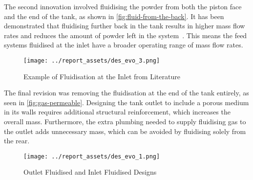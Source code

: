 The second innovation involved fluidising the powder from both the piston face and the end of the tank, as shown in \autoref{fig:fluid-from-the-back}. It has been demonstrated that fluidising further back in the tank results in higher mass flow rates and reduces the amount of powder left in the system~\cite{Tang22}. This means the feed systems fluidised at the inlet have a broader operating range of mass flow rates.
\begin{figure}[htbp]
    \centering
    
    \begin{minipage}{0.7\textwidth}
        \centering
        \texttt{[image: ../report\_assets/des\_evo\_3.png]}
        \caption{Example of Fluidisation at the Inlet from Literature~\cite{NASA2008_20080002287}}\label{fig:fluid-from-the-back}
    \end{minipage}
   
\end{figure}

The final revision was removing the fluidisation at the end of the tank entirely, as seen in \autoref{fig:gas-permeable}. Designing the tank outlet to include a porous medium in its walls requires additional structural reinforcement, which increases the overall mass. Furthermore, the extra plumbing needed to supply fluidising gas to the outlet adds unnecessary mass, which can be avoided by fluidising solely from the rear.
\begin{figure}[htbp]
    \centering
    
    \begin{minipage}{0.6\textwidth}
        \centering
        \texttt{[image: ../report\_assets/des\_evo\_1.png]}
        \caption{Outlet Fluidised and Inlet Fluidised Designs~\cite{TANG2023118406}}\label{fig:gas-permeable}
    \end{minipage}
   
\end{figure}

